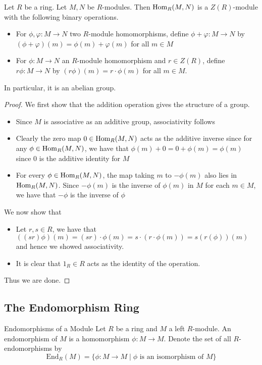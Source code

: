 \documentclass[a4paper]{article}
\begin{document}
\begin{prp}{}{} Let $R$ be a ring. Let $M,N$ be $R$-modules. Then $\operatorname{Hom}_R(M,N)$ is a $Z(R)$-module with the following binary operations. 
\begin{itemize}
\item For $\phi,\varphi:M\to N$ two $R$-module homomorphisms, define $\phi+\varphi:M\to N$ by $(\phi+\varphi)(m)=\phi(m)+\varphi(m)$ for all $m\in M$
\item For $\phi:M\to N$ an $R$-module homomorphism and $r\in Z(R)$, define $r\phi:M\to N$ by $(r\phi)(m)=r\cdot\phi(m)$ for all $m\in M$. 
\end{itemize} 
In particular, it is an abelian group. \tcbline
\begin{proof}
We first show that the addition operation gives the structure of a group. 
\begin{itemize}
\item Since $M$ is associative as an additive group, associativity follows
\item Clearly the zero map $0\in\operatorname{Hom}_R(M,N)$ acts as the additive inverse since for any $\phi\in\operatorname{Hom}_R(M,N)$, we have that $\phi(m)+0=0+\phi(m)=\phi(m)$ since $0$ is the additive identity for $M$
\item For every $\phi\in\operatorname{Hom}_R(M,N)$, the map taking $m$ to $-\phi(m)$ also lies in $\operatorname{Hom}_R(M,N)$. Since $-\phi(m)$ is the inverse of $\phi(m)$ in $M$ for each $m\in M$, we have that $-\phi$ is the inverse of $\phi$
\end{itemize}
We now show that 
\begin{itemize}
\item Let $r,s\in R$, we have that $((sr)\phi)(m)=(sr)\cdot\phi(m)=s\cdot(r\cdot\phi(m))=s(r(\phi))(m)$ and hence we showed associativity. 
\item It is clear that $1_R\in R$ acts as the identity of the operation. 
\end{itemize}
Thus we are done. 
\end{proof}
\end{prp}

\subsection{The Endomorphism Ring}
\begin{defn}{Endomorphisms of a Module}{} Let $R$ be a ring and $M$ a left $R$-module. An endomorphism of $M$ is a homomorphism $\phi:M\to M$. Denote the set of all $R$-endomorphisms by $$\text{End}_R(M)=\{\phi:M\to M\;|\;\phi\text{ is an isomorphism of }M\}$$
\end{defn}
\end{document}
